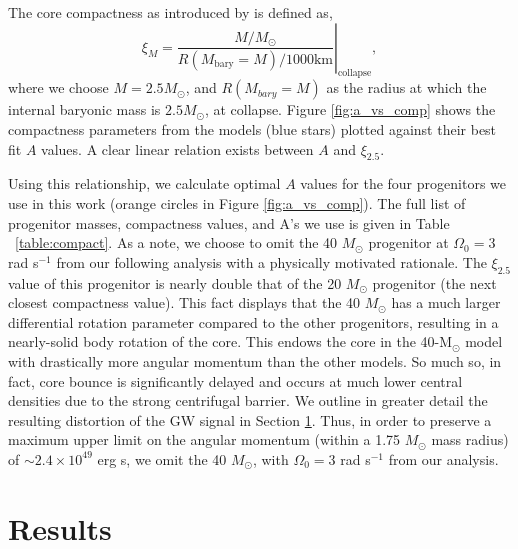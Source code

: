 \documentclass[twocolumn,times]{aastex62}  %
\newcommand{\Msun}{\ensuremath{\mathrm{M}_\odot}\xspace}
\begin{document}
The core compactness as introduced by \citet{oconnor:2011} is defined as,
\begin{equation}
    \xi_M = \left.\frac{M/M_{\odot}}{R(M_\mathrm{bary}=M)/1000 \text{km}}\right\vert_\mathrm{collapse} ,
\end{equation} 
where we choose $M = 2.5 M_\odot$, and $R(M_{bary}=M) $ as the radius at which the internal baryonic mass is $2.5M_\odot$, at collapse.  
Figure \ref{fig:a_vs_comp} shows the compactness parameters from the \citet{heger:2005} models (blue stars) plotted against their best fit $A$ values.
A clear linear relation exists between $A$ and $\xi_{2.5}$.  

Using this relationship, we calculate optimal $A$ values for the four \citet{Suk:2016} progenitors we use in this work (orange circles in Figure \ref{fig:a_vs_comp}).  
The full list of progenitor masses, compactness values, and A's we use is given in Table ~\ref{table:compact}.  
As a note, we choose to omit the 40 $M_\odot$ progenitor at $\Omega_0 = 3$ rad s$^{-1}$ from our following analysis with a physically motivated rationale.  The $\xi_{2.5}$ value of this progenitor is nearly double that of the 20 $M_\odot$ progenitor (the next closest compactness value).  This fact displays that the 40 $M_\odot$ has a much larger differential rotation parameter compared to the other progenitors, resulting in a nearly-solid body rotation of the core. This endows the core in the 40-\Msun model with drastically more angular momentum than the other models.  
So much so, in fact, core bounce is significantly delayed and occurs at much lower central densities due to the strong centrifugal barrier.
We outline in greater detail the resulting distortion of the GW signal in Section \ref{sec:results}.  Thus, in order to preserve a maximum upper limit on the angular momentum (within a 1.75 $M_\odot$ mass radius) of $\sim 2.4\times 10^{49}$ erg s, we omit the 40 $M_\odot$, with $\Omega_0 = 3$ rad s$^{-1}$ from our analysis.  \\




%


\section{Results}
\label{sec:results}
\end{document}

